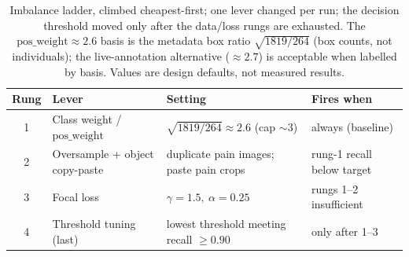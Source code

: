 \begin{table}[t]
\centering
\footnotesize
\caption[Imbalance ladder for the Phase~A detector]{Imbalance ladder, climbed
cheapest-first; one lever changed per run; the decision threshold moved only
after the data/loss rungs are exhausted. The $\mathrm{pos\_weight}\approx 2.6$
basis is the metadata box ratio $\sqrt{1819/264}$ (box counts, not
individuals); the live-annotation alternative ($\approx 2.7$) is acceptable when
labelled by basis. Values are design defaults, not measured results.}
\label{tab:eng-imbalance}
\begin{tabular}{@{}clll@{}}
\toprule
Rung & Lever & Setting & Fires when \\
\midrule
1 & Class weight / $\mathrm{pos\_weight}$
  & $\sqrt{1819/264}\approx 2.6$ (cap $\sim 3$)
  & always (baseline) \\
2 & Oversample + object copy-paste
  & duplicate pain images; paste pain crops
  & rung-1 recall below target \\
3 & Focal loss
  & $\gamma=1.5,\ \alpha=0.25$
  & rungs 1--2 insufficient \\
4 & Threshold tuning (last)
  & lowest threshold meeting recall $\geq 0.90$
  & only after 1--3 \\
\bottomrule
\end{tabular}
\end{table}

